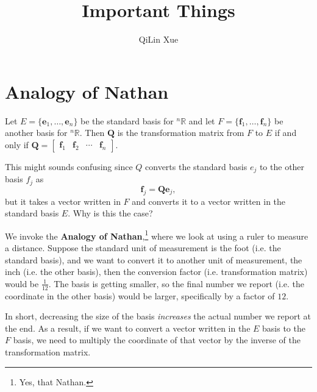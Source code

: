 \documentclass{article}
\title{Important Things}
\author{QiLin Xue}
\begin{document}
    \maketitle
    \section{Analogy of Nathan}
    Let $E=\{\bm{e}_1,\dots,\bm{e}_n\}$ be the standard basis for ${^n}\mathbb{R}$ and let $F = \{\bm{f}_1,\dots,\bm{f}_n\}$ be another basis for ${^n}\mathbb{R}$. Then $\bm{Q}$ is the transformation matrix from $F$ to $E$ if and only if $\bm{Q} = \begin{bmatrix}
        \bm{f}_1 & \bm{f}_2 & \cdots & \bm{f}_n 
    \end{bmatrix}$.
    
    This might sounds confusing since $Q$ converts the standard basis $e_j$ to the other basis $f_j$ as
    \begin{equation}
        \bm{f}_j=\bm{Q}\bm{e}_j,
    \end{equation}
    but it takes a vector written in $F$ and converts it to a vector written in the standard basis $E$. Why is this the case?

    We invoke the \textbf{Analogy of Nathan},\footnote{Yes, that Nathan.} where we look at using a ruler to measure a distance. Suppose the standard unit of measurement is the foot (i.e. the standard basis), and we want to convert it to another unit of measurement, the inch (i.e. the other basis), then the conversion factor (i.e. transformation matrix) would be $\frac{1}{12}$. The basis is getting smaller, so the final number we report (i.e. the coordinate in the other basis) would be larger, specifically by a factor of $12$.

    In short, decreasing the size of the basis \textit{increases} the actual number we report at the end. As a result, if we want to convert a vector written in the $E$ basis to the $F$ basis, we need to multiply the coordinate of that vector by the inverse of the transformation matrix.
\end{document}
